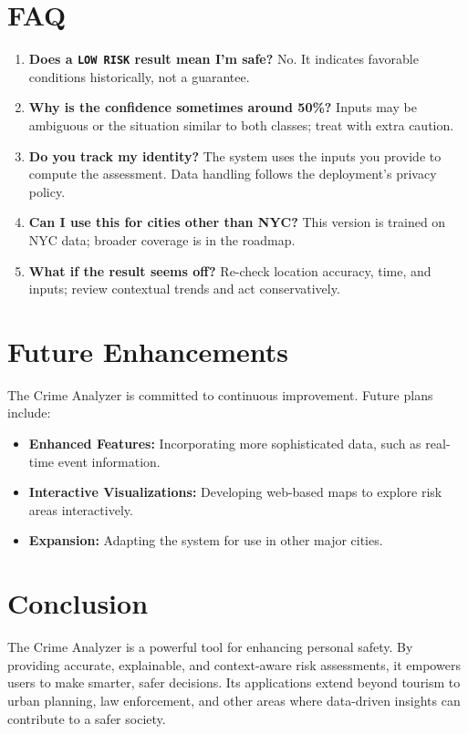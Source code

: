 \documentclass[11pt]{article}
\begin{document}
\section{FAQ}
\begin{enumerate}[leftmargin=*]
  \item \textbf{Does a \texttt{LOW RISK} result mean I'm safe?} No. It indicates favorable conditions historically, not a guarantee.
  \item \textbf{Why is the confidence sometimes around 50\%?} Inputs may be ambiguous or the situation similar to both classes; treat with extra caution.
  \item \textbf{Do you track my identity?} The system uses the inputs you provide to compute the assessment. Data handling follows the deployment's privacy policy.
  \item \textbf{Can I use this for cities other than NYC?} This version is trained on NYC data; broader coverage is in the roadmap.
  \item \textbf{What if the result seems off?} Re-check location accuracy, time, and inputs; review contextual trends and act conservatively.
\end{enumerate}

\section{Future Enhancements}
The Crime Analyzer is committed to continuous improvement. Future plans include:
\begin{itemize}[leftmargin=*]
\item \textbf{Enhanced Features:} Incorporating more sophisticated data, such as real-time event information.
\item \textbf{Interactive Visualizations:} Developing web-based maps to explore risk areas interactively.
\item \textbf{Expansion:} Adapting the system for use in other major cities.
\end{itemize}

\section{Conclusion}
The Crime Analyzer is a powerful tool for enhancing personal safety. By providing accurate, explainable, and context-aware risk assessments, it empowers users to make smarter, safer decisions. Its applications extend beyond tourism to urban planning, law enforcement, and other areas where data-driven insights can contribute to a safer society.
\end{document}
